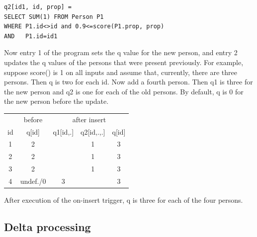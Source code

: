\begin{example}
\begin{verbatim}
q2[id1, id, prop] =
SELECT SUM(1) FROM Person P1
WHERE P1.id<>id and 0.9<=score(P1.prop, prop)
AND   P1.id=id1 
\end{verbatim}

Now entry 1 of the program sets the q value for the new person, and
entry 2 updates the q values of the persons that were present previously.
For example, suppose score() is 1 on all inputs and assume that, currently,
there are three persons. Then q is two for each id. Now add a fourth person.
Then q1 is three for the new person and q2 is one for each of the old persons.
By default, q is 0 for the new person before the update.
%
\begin{center}
\begin{tabular}{c|c|c|c|c}
   & before    & \multicolumn{3}{c}{after insert} \\
id & q[id]     & q1[id,.] & q2[id,.,.] & q[id] \\
\hline
1  & 2         &          & 1          & 3 \\
2  & 2         &          & 1          & 3 \\
3  & 2         &          & 1          & 3 \\
4  & undef./0  & 3        &            & 3 \\
\end{tabular}
\end{center}
%
After execution of the on-insert trigger, q is three for each of the four
persons.
\punto
\end{example}


\subsection{Delta processing}


